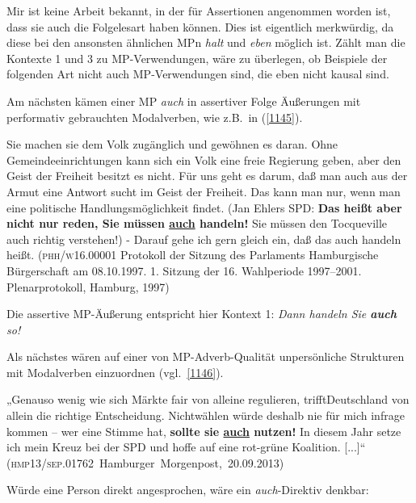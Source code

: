 Mir ist keine Arbeit bekannt, in der für Assertionen angenommen worden ist, dass sie auch die Folgelesart haben können. Dies ist eigentlich merkwürdig, da diese bei den ansonsten ähnlichen MPn \textit{halt} und \textit{eben} möglich ist. Zählt man die Kontexte 1 und 3 zu MP-Verwendungen, wäre zu überlegen, ob Beispiele der folgenden Art nicht auch MP-Verwendungen sind, die eben nicht kausal sind. 

Am nächsten kämen einer MP \textit{auch} in assertiver Folge Äußerungen mit performativ gebrauchten  Modalverben, wie z.B.\ in (\ref{1145}).

\begin{exe}
	\ex\label{1145} 

 	Sie machen sie dem Volk zugänglich und gewöhnen es daran. Ohne Gemeindeeinrichtungen kann sich ein Volk eine freie Regierung geben, aber den Geist der 		Freiheit besitzt es nicht. Für uns geht es darum, daß man auch aus der Armut eine Antwort sucht im Geist der Freiheit. Das kann man nur, wenn man eine 		politische Handlungsmöglichkeit findet. (Jan Ehlers SPD: \textbf{Das heißt aber nicht nur reden, Sie müssen \ul{auch} handeln!} Sie müssen den 		Tocqueville auch richtig verstehen!) - Darauf gehe ich gern gleich ein, daß das auch handeln heißt. 
	\newline(\textsc{phh/w16.00001} Protokoll der Sitzung des Parlaments Hamburgische Bürgerschaft am 08.10.1997. 1. Sitzung der 16. Wahlperiode 1997--2001. Plenarprotokoll, Hamburg, 1997)
\end{exe}
Die assertive MP-Äußerung entspricht hier Kontext 1: \textit{Dann handeln Sie \textbf{auch} so!}

Als nächstes wären auf einer  von MP-Adverb-Qualität unpersönliche Strukturen mit Modalverben einzuordnen (vgl.\ \ref{1146}).

\begin{exe}
	\ex\label{1146} 

 	„Genauso wenig wie sich Märkte fair von alleine regulieren, trifft\linebreak Deutschland von allein die richtige Entscheidung. Nichtwählen würde deshalb nie 	für mich infrage kommen – wer eine Stimme hat, \textbf{sollte sie \ul{auch} nutzen!} In diesem Jahr setze ich mein Kreuz bei der SPD und hoffe 		auf eine rot-grüne Koalition. [...]“	
	\newline\hbox{}\hfill\hbox{(\textsc{hmp13/sep.01762} Hamburger Morgenpost, 20.09.2013)}
\end{exe}
Würde eine Person direkt angesprochen, wäre ein \textit{auch}-Direktiv denkbar:

